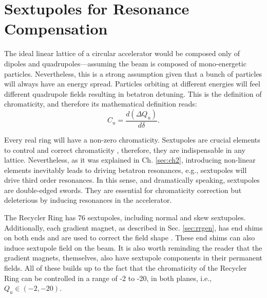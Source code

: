 \section{\label{sec:css}Sextupoles for Resonance Compensation}

The ideal linear lattice of a circular accelerator would be composed only of dipoles and quadrupoles---assuming the beam is composed of mono-energetic particles. Nevertheless, this is a strong assumption given that a bunch of particles will always have an energy spread. Particles orbiting at different energies will feel different quadrupole fields resulting in  betatron detuning. This is the definition of chromaticity, and therefore its mathematical definition reads:
\begin{equation}
   \label{eq:chrom}
   C_u=\frac{d \left( \Delta Q_u \right)}{d \delta}.
\end{equation}    

Every real ring will have a non-zero chromaticity. Sextupoles are crucial elements to control and correct chromaticity \cite{sylee}, therefore, they are indispensable in any lattice. Nevertheless, as it was explained in Ch. \ref{sec:ch2}, introducing non-linear elements inevitably leads to driving betatron resonances, e.g., sextupoles will drive third order resonances. In this sense, and dramatically speaking, sextupoles are double-edged swords. They are essential for chromaticity correction but deleterious by inducing resonances in the accelerator.

The Recycler Ring has 76 sextupoles, including normal and skew sextupoles. Additionally, each gradient magnet, as described in Sec. \ref{sec:rrgen}, has end shims on both ends and are used to correct the field shape \cite{meiqin2}. These end shims can also induce sextupole field on the beam. It is also worth reminding the reader that the gradient magnets, themselves, also have sextupole components in their permanent fields. All of these builds up to the fact that the chromaticity of the Recycler Ring can be controlled in a range of -2 to -20, in both planes, i.e., $Q_u\in (-2, -20)$.    

